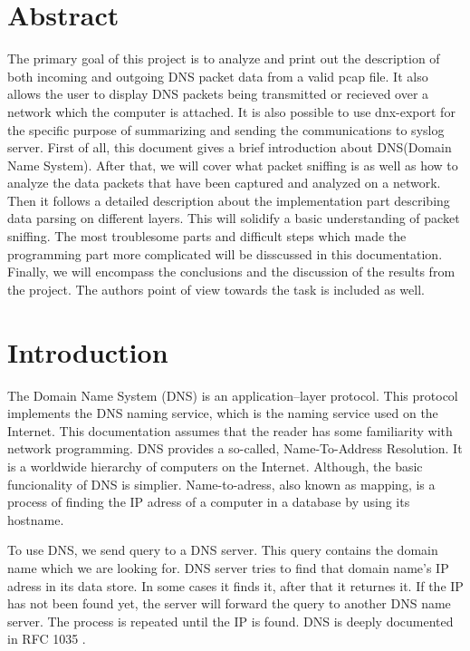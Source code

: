 \documentclass[11pt,a4paper]{article}
\begin{document}


\setlength{\parskip}{0pt}
\hypersetup{hidelinks}\tableofcontents
\setlength{\parskip}{0pt}

\newpage %

\section{Abstract}

The primary goal of this project is to analyze and print out the description of both incoming and outgoing DNS packet data from a valid pcap file. It also allows the user to display DNS packets being transmitted or recieved over a network which the computer is attached. It is also possible to use dnx-export for the specific purpose of summarizing and sending the communications to syslog server. First of all, this document gives a brief introduction about DNS(Domain Name System). After that, we will cover what packet sniffing is as well as how to analyze the data packets that have been captured and analyzed on a network. Then it follows a detailed description about the implementation part describing data parsing on different layers. This will solidify a basic understanding of packet sniffing. The most troublesome parts and difficult steps which made the programming part more complicated will be disscussed in this documentation. Finally, we will encompass the conclusions and the discussion of the results from the project. The authors point of view towards the task is included as well.

\section{Introduction}

The Domain Name System (DNS) is an application–layer protocol. This protocol implements the DNS naming service, which is the naming service used on the Internet. This documentation assumes that the reader has some familiarity with network programming. DNS provides a so-called, Name-To-Address Resolution. It is a worldwide hierarchy of computers on the Internet. Although, the basic funcionality of DNS is simplier. Name-to-adress, also known as mapping, is a process of finding the IP adress of a computer in a database by using its hostname.

To use DNS, we send query to a DNS server. This query contains the domain name which we are looking for. DNS server tries to find that domain name's IP adress in its data store. In some cases it finds it, after that it returnes it. If the IP has not been found yet, the server will forward the query to another DNS name server. The process is repeated until the IP is found\cite{DNS}. DNS is deeply documented in RFC 1035 \cite{RFC1035}.
\end{document}

